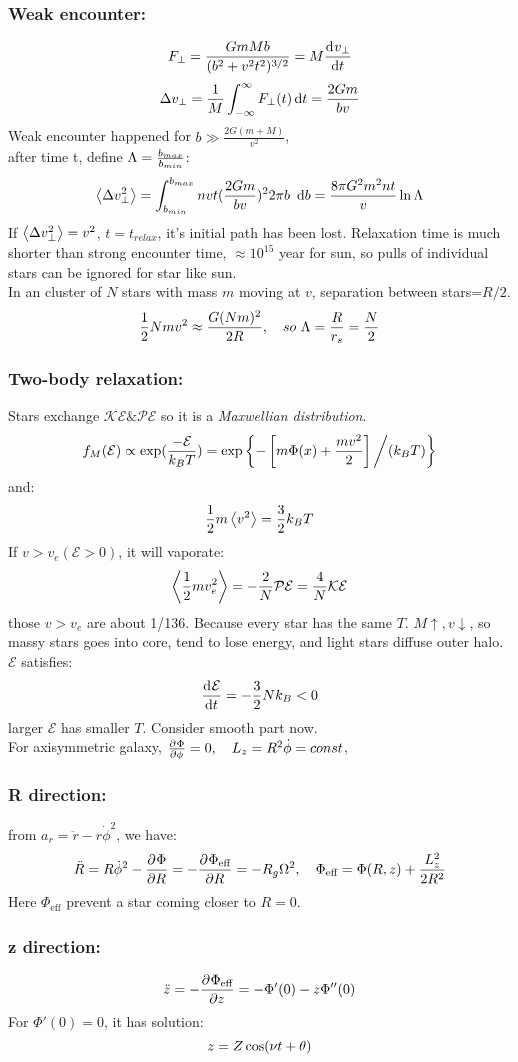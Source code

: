 \documentclass[UTF8,9pt]{ctexart}
\begin{document}
\subsubsection*{Weak encounter:}
$$F_{\perp}=\frac{GmMb}{(b^2+v^2t^2)^{3/2}}=M\frac{\mathrm{d}^{} v_\perp}{\mathrm{d} t^{}}$$
$$\Delta v_\perp=\frac{1}{M}\int_{-\infty}^\infty F_\perp (t)\mathop{}\!\mathrm{d} t=\frac{2Gm}{bv}$$
Weak encounter happened for $b \gg \frac{2G(m+M)}{v^2}$, \\
after time t, define $\Lambda=\frac{b_{max}}{b_{min}}$:
$$\left<\Delta v_\perp^2\right>=\int_{b_{min}}^{b_{max}}nvt(\frac{2Gm}{bv})^22\pi b\ \mathop{}\!\mathrm{d} b=\frac{8\pi G^2m^2nt}{v}\ln\Lambda$$
If $\left<\Delta v_\perp^2\right>=v^2$, $t=t_{relax}$, it's initial path has been lost. Relaxation time is much shorter than strong encounter time, $\approx 10^{15}$ year for sun, so pulls of individual stars can be ignored for star like sun.\\
In an cluster of $N$ stars with mass $m$ moving at $v$, separation between stars=$R/2$.
$$\frac{1}{2}Nmv^2 \approx \frac{G(Nm)^2}{2R},\quad so\ \Lambda=\frac{R}{r_s}=\frac{N}{2}$$
\subsubsection*{Two-body relaxation:}
Stars exchange $\mathcal{KE} \& \mathcal{PE}$ so it is a \emph{Maxwellian distribution}.
$$f_M(\mathcal{E}) \propto  \exp(\frac{-\mathcal{E}}{k_BT})=\exp\left\{-\left[m\Phi(x)+\frac{mv^2}{2}\right]\bigg/(k_BT)\right\}$$
and:
$$\frac{1}{2}m\left<v^2\right>=\frac{3}{2}k_BT$$
If $v>v_e(\mathcal{E}>0)$, it will vaporate: 
$$\left<\frac{1}{2}mv_e^2\right>=-\frac{2}{N}\mathcal{PE}=\frac{4}{N}\mathcal{KE}$$
those $v>v_e$ are about 1/136. Because every star has the same $T$. $M\uparrow, v\downarrow$, so massy stars goes into core, tend to lose energy, and light stars diffuse outer halo. \\
$\mathcal{E}$ satisfies:
$$\frac{\mathrm{d}^{} \mathcal{E}}{\mathrm{d} t^{}}=-\frac{3}{2}Nk_B<0$$
larger $\mathcal{E}$ has smaller $T$.
Consider smooth part now.\\
For axisymmetric galaxy, $\frac{\partial^{} \Phi}{\partial {\phi}^{}}=0,\quad L_z=R^2\dot{\phi}=const$, 
\subsubsection*{R direction:}
from $a_r=\ddot{r}-r\dot{\phi}^2$, we have:
$$\ddot{R}=R\dot{\phi}^2-\frac{\partial^{} \Phi}{\partial {R}^{}}=-\frac{\partial^{} \Phi_{\text{eff}}}{\partial {R}^{}}=-R_g\Omega^2,\quad  \Phi_{\text{eff}}=\Phi(R,z)+\frac{L_z^2}{2R^2}$$
Here $\Phi_{\text{eff}}$ prevent a star coming closer to $R=0$.
\subsubsection*{z direction:}
$$\ddot{z}=-\frac{\partial^{} \Phi_{\text{eff}}}{\partial {z}^{}}=-\Phi'(0)-z\Phi''(0)$$
For $\Phi'(0)=0$, it has solution: $$z=Z\cos(\nu t+\theta)$$
\end{document}
